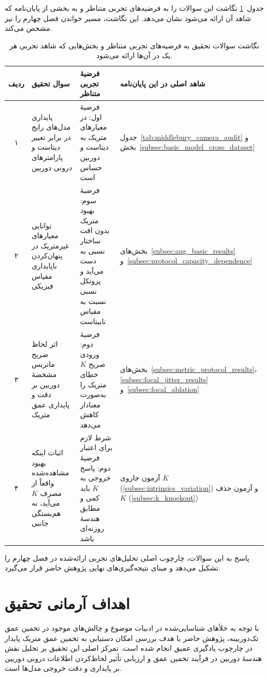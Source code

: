 جدول~\ref{tab:rq_hypothesis_map} نگاشت این سوالات را به فرضیه‌های تجربی متناظر و به بخشی از پایان‌نامه که شاهد آن ارائه می‌شود نشان می‌دهد. این نگاشت، مسیر خواندن فصل چهارم را نیز مشخص می‌کند.

\begin{table}[htbp]
\centering
\caption[نگاشت سوالات تحقیق به فرضیه‌ها و شواهد]{نگاشت سوالات تحقیق به
فرضیه‌های تجربی متناظر و بخش‌هایی که شاهد تجربی هر یک در آن‌ها ارائه می‌شود.}
\label{tab:rq_hypothesis_map}
\small
\renewcommand{\arraystretch}{1.3}
\begin{tabularx}{\textwidth}{@{}c
  >{\raggedleft\arraybackslash}X
  >{\raggedleft\arraybackslash}X
  >{\raggedleft\arraybackslash}p{}@{}}
\toprule
ردیف & سوال تحقیق & فرضیهٔ تجربی متناظر & شاهد اصلی در این پایان‌نامه \\ \midrule
۱ &
پایداری مدل‌های رایج در برابر تغییر دیتاست و پارامترهای درونی دوربین &
فرضیهٔ اول: \basemodel{} در معیارهای متریک به دیتاست و دوربین حساس است &
جدول~\ref{tab:middlebury_camera_audit} و بخش~\ref{subsec:basic_model_cross_dataset} \\
۲ &
توانایی معیارهای غیرمتریک در پنهان‌کردن ناپایداری مقیاس فیزیکی &
فرضیهٔ سوم: بهبود متریک بدون افت ساختار نسبی به دست می‌آید و پروتکل نسبی نسبت به مقیاس نابیناست &
بخش‌های~\ref{subsec:aug_basic_results} و~\ref{subsec:protocol_capacity_dependence} \\
۳ &
اثر لحاظ صریح ماتریس مشخصهٔ دوربین بر دقت و پایداری عمق متریک &
فرضیهٔ دوم: ورودی صریح $K$ خطای متریک را به‌صورت معنادار کاهش می‌دهد &
بخش‌های~\ref{subsec:metric_protocol_results}، \ref{subsec:focal_jitter_results} و~\ref{subsec:focal_ablation} \\
۴ &
اثبات اینکه بهبود مشاهده‌شده واقعاً از مصرف $K$ می‌آید، نه هم‌بستگی جانبی &
شرط لازم برای اعتبار فرضیهٔ دوم: پاسخ خروجی به $K$ باید کمی و مطابق هندسهٔ روزنه‌ای باشد &
آزمون جاروی $K$ (\ref{subsec:intrinsics_variation}) و آزمون حذف $K$ (\ref{subsec:k_knockout}) \\
\bottomrule
\end{tabularx}
\end{table}

پاسخ به این سوالات، چارچوب اصلی تحلیل‌های تجربی ارائه‌شده در فصل چهارم را تشکیل می‌دهد و مبنای نتیجه‌گیری‌های نهایی پژوهش حاضر قرار می‌گیرد.


\section{اهداف آرمانی تحقیق}
با توجه به خلأهای شناسایی‌شده در ادبیات موضوع و چالش‌های موجود در تخمین عمق تک‌دوربینه، پژوهش حاضر با هدف بررسی امکان دستیابی به تخمین عمق متریک پایدار در چارچوب یادگیری عمیق انجام شده است. تمرکز اصلی این تحقیق بر تحلیل نقش هندسهٔ دوربین در فرآیند تخمین عمق و ارزیابی تأثیر لحاظ‌کردن اطلاعات درونی دوربین بر پایداری و دقت خروجی مدل‌ها است.

